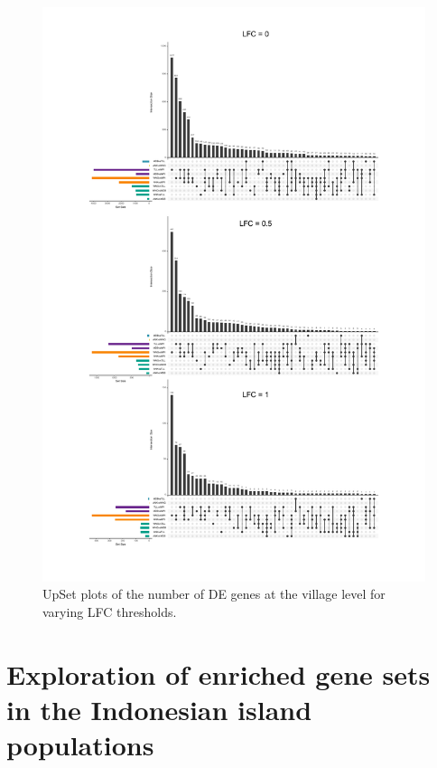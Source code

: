 \documentclass[12pt,a4paper,titlepage,twoside,openright]{book}
\begin{document}
\begin{mainmatter}
{{\begin{figure}[htb!]
\centering
\includegraphics[width=\textwidth,height=\textheight,keepaspectratio]{Figures/UpsetR_Village_AllLFCs.pdf}
\caption{UpSet plots of the number of DE genes at the village level for varying LFC thresholds.}
\label{fig:UpsetR Village}
\end{figure}

\section{Exploration of enriched gene sets in the Indonesian island populations}

}}
\end{mainmatter}
\end{document}
